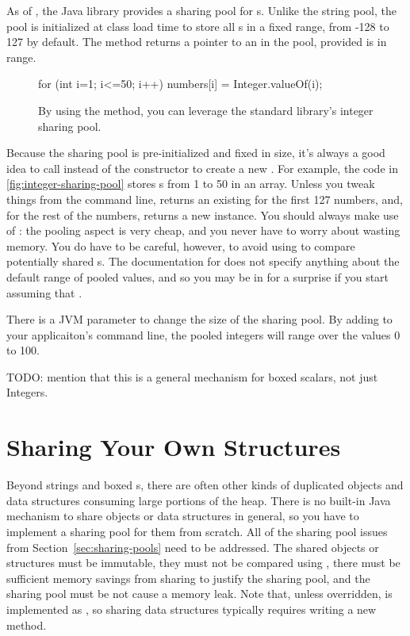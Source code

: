 As of \javafive, the Java library provides a sharing pool for s.
Unlike the string pool, the  pool is initialized at class load
time to store all s in a fixed range, from -128 to 127 by
default. The method  returns a
pointer to an  in the pool, provided  is in range.

\begin{figure}
\centering
\begin{framedlisting}
for (int i=1; i<=50; i++) {
 numbers[i] = Integer.valueOf(i);
}
\end{framedlisting}
\caption{By using the  method, you can leverage the standard
library's integer sharing pool.}
\label{fig:integer-sharing-pool}
\end{figure}
Because the  sharing pool is pre-initialized and fixed in size,
it's always a good idea to call  instead of the
constructor to create a new . For example, the code in
\autoref{fig:integer-sharing-pool} stores s from 1 to 50 in an
array. Unless you tweak things from the command line,
 returns an existing 
for the first 127 numbers, and, for the rest of the numbers, 
returns a new  instance. You should always make use of
: the pooling aspect is very cheap, and you never have to
worry about wasting memory. You do have to be careful, however, to avoid using
\code{==} to compare potentially shared s. The documentation for
 does not specify anything about the default range of pooled
values, and so you may be in for a surprise if you start assuming that
.

There is a JVM parameter to change the size of the  sharing pool.
By adding  to your applicaiton's command line, the
pooled integers will range over the values 0 to 100.

TODO: mention that this is a general mechanism for boxed scalars, not just
Integers.

\section{Sharing Your Own Structures}
\label{sec:canonicalizing-maps}

Beyond strings and boxed s, there are often other kinds of
duplicated objects and data structures consuming large portions of the heap. 
There is no built-in Java mechanism to share objects or data
structures in general, so you have to implement a sharing pool for them from
scratch. All of the sharing pool issues from Section~\ref{sec:sharing-pools} need to be
addressed. The shared objects or structures must be immutable, they must not be
compared using \code{==}, there must be sufficient memory savings from sharing
to justify the sharing pool, and the sharing pool must be not cause a memory leak. 
Note that, unless overridden,  is
implemented as \code{==}, so sharing data structures typically requires writing
a new  method.

